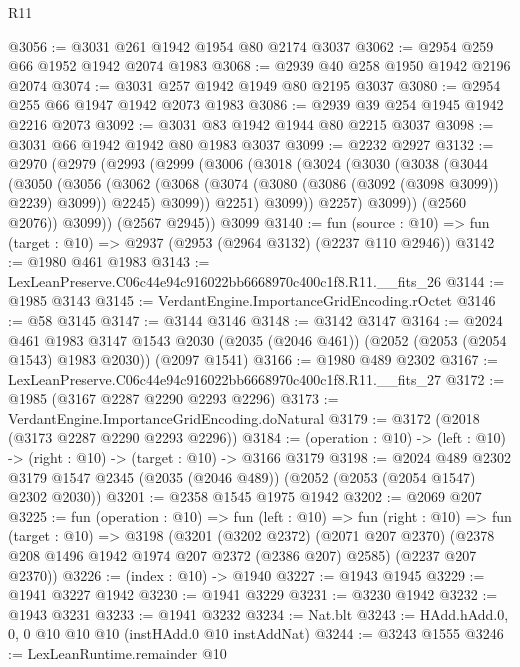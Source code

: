 \begin{lexlean}{R11}
\begin{coremodule}
@3056 := @3031 @261 @1942 @1954 @80 @2174 @3037
@3062 := @2954 @259 @66 @1952 @1942 @2074 @1983
@3068 := @2939 @40 @258 @1950 @1942 @2196 @2074
@3074 := @3031 @257 @1942 @1949 @80 @2195 @3037
@3080 := @2954 @255 @66 @1947 @1942 @2073 @1983
@3086 := @2939 @39 @254 @1945 @1942 @2216 @2073
@3092 := @3031 @83 @1942 @1944 @80 @2215 @3037
@3098 := @3031 @66 @1942 @1942 @80 @1983 @3037
@3099 := @2232 @2927
@3132 := @2970
    (@2979
      (@2993
        (@2999
          (@3006
            (@3018
              (@3024
                (@3030
                  (@3038
                    (@3044
                      (@3050
                        (@3056
                          (@3062
                            (@3068 (@3074 (@3080 (@3086 (@3092 (@3098 @3099)) @2239) @3099)) @2245)
                            @3099))
                        @2251)
                      @3099))
                  @2257)
                @3099))
            (@2560 @2076))
          @3099))
      (@2567 @2945))
    @3099
@3140 := fun (source : @10) => fun (target : @10) => @2937 (@2953 (@2964 @3132) (@2237 @110 @2946))
@3142 := @1980 @461 @1983
@3143 := LexLeanPreserve.C06c44e94c916022bb6668970c400c1f8.R11.__fits_26
@3144 := @1985 @3143
@3145 := VerdantEngine.ImportanceGridEncoding.rOctet
@3146 := @58 @3145
@3147 := @3144 @3146
@3148 := @3142 @3147
@3164 := @2024
    @461
    @1983
    @3147
    @1543
    @2030
    (@2035 (@2046 @461))
    (@2052 (@2053 (@2054 @1543) @1983 @2030))
    (@2097 @1541)
@3166 := @1980 @489 @2302
@3167 := LexLeanPreserve.C06c44e94c916022bb6668970c400c1f8.R11.__fits_27
@3172 := @1985 (@3167 @2287 @2290 @2293 @2296)
@3173 := VerdantEngine.ImportanceGridEncoding.doNatural
@3179 := @3172 (@2018 (@3173 @2287 @2290 @2293 @2296))
@3184 := (operation : @10) -> (left : @10) -> (right : @10) -> (target : @10) -> @3166 @3179
@3198 := @2024
    @489
    @2302
    @3179
    @1547
    @2345
    (@2035 (@2046 @489))
    (@2052 (@2053 (@2054 @1547) @2302 @2030))
@3201 := @2358 @1545 @1975 @1942
@3202 := @2069 @207
@3225 := fun (operation : @10) =>
  fun (left : @10) =>
  fun (right : @10) =>
  fun (target : @10) =>
  @3198
    (@3201
      (@3202 @2372)
      (@2071 @207 @2370)
      (@2378 @208 @1496 @1942 @1974 @207 @2372 (@2386 @207) @2585)
      (@2237 @207 @2370))
@3226 := (index : @10) -> @1940
@3227 := @1943 @1945
@3229 := @1941 @3227 @1942
@3230 := @1941 @3229
@3231 := @3230 @1942
@3232 := @1943 @3231
@3233 := @1941 @3232
@3234 := Nat.blt
@3243 := HAdd.hAdd.{0, 0, 0} @10 @10 @10 (instHAdd.{0} @10 instAddNat)
@3244 := @3243 @1555
@3246 := LexLeanRuntime.remainder @10

\end{coremodule}
\end{lexlean}
